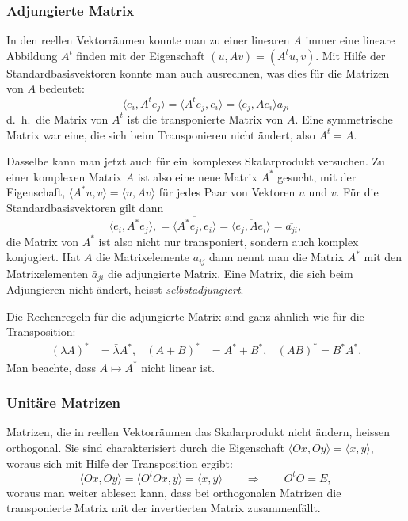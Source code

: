 %
%
\subsubsection{Adjungierte Matrix}
In den reellen Vektorräumen konnte man zu einer linearen $A$ immer
eine lineare Abbildung $A^t$ finden mit der Eigenschaft
$(u,Av)=(A^tu,v)$. Mit Hilfe der Standardbasisvektoren konnte
man auch ausrechnen, was dies für die Matrizen von $A$ bedeutet:
\[
\langle e_i,A^te_j\rangle
=
\langle A^te_j, e_i\rangle
=
\langle e_j,Ae_i\rangle a_{ji}
\]
d.~h.~die Matrix von $A^t$ ist die transponierte Matrix von $A$.
Eine symmetrische Matrix war eine, die sich beim Transponieren nicht
ändert, also $A^t=A$.

Dasselbe kann man jetzt auch für ein komplexes Skalarprodukt
versuchen. Zu einer komplexen Matrix $A$ ist also eine neue
Matrix $A^*$ gesucht, mit der Eigenschaft,
$\langle A^*u,v\rangle=\langle u,Av\rangle$ für 
jedes Paar von Vektoren $u$ und $v$. Für die Standardbasisvektoren
gilt dann
\[
\langle e_i,A^*e_j\rangle,
=
\overline{\langle A^*e_j, e_i\rangle}
=
\overline{\langle e_j,Ae_i\rangle}=\overline{a_{ji}},
\]
die Matrix von $A^*$ ist also nicht nur transponiert, sondern auch komplex
konjugiert. Hat $A$ die Ma\-trix\-e\-le\-men\-te $a_{ij}$ dann nennt man
die Matrix $A^*$ mit den Matrixelementen $\bar a_{ji}$ die
adjungierte Matrix. Eine Matrix, die sich beim Adjungieren nicht
ändert, heisst {\em selbstadjungiert}.

Die Rechenregeln für die adjungierte Matrix sind ganz ähnlich wie
für die Transposition:
%
\[
\begin{aligned}
(\lambda A)^*&=\bar\lambda A^*,
&
(A+B)^*&=A^*+B^*,
&
(AB)^*=B^*A^*.
\end{aligned}
\]
Man beachte, dass $A\mapsto A^*$ nicht linear ist.

\subsubsection{Unitäre Matrizen}
Matrizen, die in reellen Vektorräumen das Skalarprodukt nicht ändern,
heissen orthogonal. Sie sind charakterisiert durch die Eigenschaft
%
%
$\langle Ox,Oy\rangle=\langle x,y\rangle$, woraus sich mit Hilfe der
Transposition ergibt:
\[
\langle Ox,Oy\rangle=\langle O^tOx,y\rangle=\langle x,y\rangle
\qquad\Rightarrow\qquad
O^tO=E,
\]
woraus man weiter ablesen kann, dass bei orthogonalen Matrizen
die transponierte Matrix mit der invertierten Matrix zusammenfällt.

